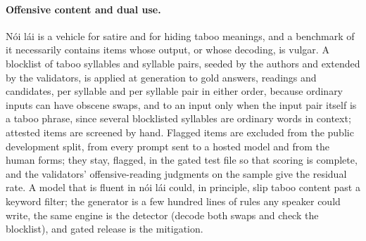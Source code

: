 \paragraph{Offensive content and dual use.}
Nói lái is a vehicle for satire and for hiding taboo meanings, and a benchmark of it necessarily contains items whose output, or whose decoding, is vulgar. A blocklist of taboo syllables and syllable pairs, seeded by the authors and extended by the validators, is applied at generation to gold answers,  readings and  candidates, per syllable and per syllable pair in either order, because ordinary inputs can have obscene swaps, and to an input only when the input pair itself is a taboo phrase, since several blocklisted syllables are ordinary words in context; attested items are screened by hand. Flagged items are excluded from the public development split, from every prompt sent to a hosted model and from the human forms; they stay, flagged, in the gated test file so that scoring is complete, and the validators' offensive-reading judgments on the sample give the residual rate. A model that is fluent in nói lái could, in principle, slip taboo content past a keyword filter; the generator is a few hundred lines of rules any speaker could write, the same engine is the detector (decode both swaps and check the blocklist), and gated release is the mitigation.

